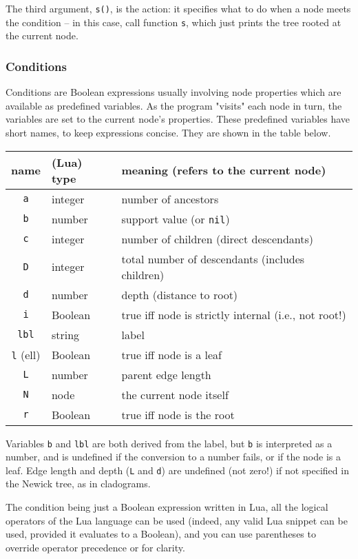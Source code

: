 The third argument, \texttt{s()}, is the action: it specifies what to do when a
node meets the condition -- in this case, call function \texttt{s},
which just prints the tree rooted at the current node.

\subsubsection{Conditions}

Conditions are Boolean expressions usually involving node properties which are
available as predefined variables. As the program "visits" each node in turn,
the variables are set to the current node's properties.  These predefined
variables have short names, to keep expressions concise. They are shown in the
table below.

\begin{center}
\begin{tabular}{cll}
name & (Lua) type & meaning (refers to the current node)\\
\hline
\texttt{a} & integer & number of ancestors  \\
\texttt{b} & number & support value (or \texttt{nil}) \\
\texttt{c} & integer & number of children (direct descendants) \\
\texttt{D} & integer & total number of descendants (includes children) \\
\texttt{d} & number & depth (distance to root) \\
\texttt{i} & Boolean & true iff node is strictly internal (i.e., not root!) \\
\texttt{lbl} & string & label \\
\texttt{l} (ell) & Boolean & true iff node is a leaf \\
\texttt{L} & number & parent edge length \\
\texttt{N} & node & the current node itself \\
\texttt{r} & Boolean & true iff node is the root
\end{tabular}
\end{center}

\noindent{}Variables \texttt{b} and \texttt{lbl} are both derived from the
label, but \texttt{b} is interpreted as a number, and is undefined if the
conversion to a number fails, or if the node is a leaf. Edge length and depth
(\texttt{L} and \texttt{d}) are undefined (not zero!) if not specified in the
Newick tree, as in cladograms.

The condition being just a Boolean expression written in Lua, all the logical
operators of the Lua language can be used (indeed, any valid Lua snippet can be
used, provided it evaluates to a Boolean), and you can use parentheses to
override operator precedence or for clarity.

